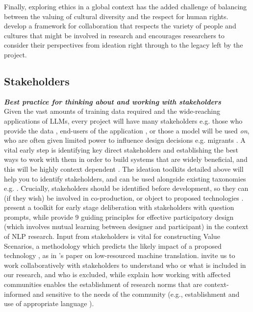Finally, exploring ethics in a global context has the added challenge of balancing between the valuing of cultural diversity and the respect for human rights. \citet{reid_ethics_2021} develop a framework for collaboration that respects the variety of people and cultures that might be involved in research and encourages researchers to consider their perspectives from ideation right through to the legacy left by the project. 

\subsection{Stakeholders}\label{sec:stakeholders}
\noindent\textbf{\textit{Best practice for thinking about and working with stakeholders}}\\

\noindent Given the vast amounts of training data required and the wide-reaching applications of LLMs, every project will have many stakeholders e.g. those who provide the data \citep{havens_situated_2020}, end-users of the application \citep{yang2023impact}, or those a model will be used \emph{on}, who are often given limited power to influence design decisions e.g. migrants \citep{nalbandian_eye_2022}. A vital early step is identifying key direct stakeholders and establishing the best ways to work with them in order to build systems that are widely beneficial, and this will be highly context dependent \citep{sloane_participation_2022}. The ideation toolkits detailed above will help you to identify stakeholders, and can be used alongside existing taxonomies e.g. \citep[i.a.]{lewis_global_2020,langer_what_2021, bird_typology_2023, havens_situated_2020}. 
Crucially, stakeholders should be identified before development, so they can (if they wish) be involved in co-production, or object to proposed technologies \citep{munn_uselessness_2022}. \citet{kawakami_situate_2024} present a toolkit for early stage deliberation with stakeholders with question prompts, while \citet{caselli_guiding_2021} provide 9 guiding principles for effective participatory design (which involves mutual learning between designer and participant) in the context of NLP research. %
Input from stakeholders is vital for constructing Value Scenarios, a methodology which predicts the likely impact of a proposed technology \citep{nathan_value_2007}, as in \citet{haroutunian_ethical_2022}'s paper on low-resourced machine translation. 
\citet{havens_situated_2020} invite us to work collaboratively with stakeholders to understand who or what is included in our research, and who is excluded, while \citet{jurgens_just_2019} explain how working with affected communities enables the establishment of research norms that are context-informed and sensitive to the needs of the community (e.g., establishment and use of appropriate language \citep{jurgens_just_2019}).

